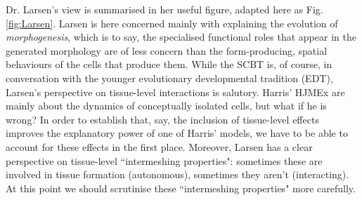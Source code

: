Dr. Larsen's view is summarised in her useful figure, adapted here as Fig. \ref{fig:Larsen}. Larsen is here concerned mainly with explaining the evolution of \textit{morphogenesis}, which is to say, the specialised functional roles that appear in the generated morphology are of less concern than the form-producing, spatial behaviours of the cells that produce them. While the SCBT is, of course, in conversation with the younger evolutionary developmental tradition (EDT), Larsen's perspective on tissue-level interactions is salutory. Harris' HJMEx are mainly about the dynamics of conceptually isolated cells, but what if he is wrong? In order to establish that, say, the inclusion of tissue-level effects improves the explanatory power of one of Harris' models, we have to be able to account for these effects in the first place. Moreover, Larsen has a clear perspective on tissue-level ``intermeshing properties": sometimes these are involved in tissue formation (autonomous), sometimes they aren't (interacting). At this point we should scrutinise these ``intermeshing properties" more carefully.

